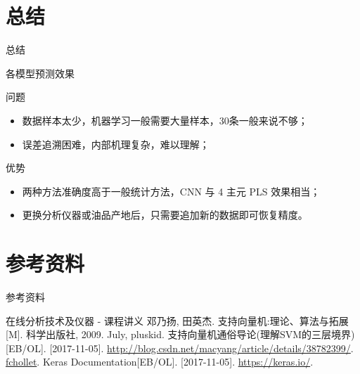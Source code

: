 \documentclass[11pt]{beamer}
\begin{document}
	\section{总结}
	\begin{frame}{总结}
		\begin{block}{各模型预测效果}
		\end{block}
		\begin{block}{问题}
			\begin{itemize}
				\item 数据样本太少，机器学习一般需要大量样本，30条一般来说不够；
				\item 误差追溯困难，内部机理复杂，难以理解；
			\end{itemize}
		\end{block}
		\begin{block}{优势}
			\begin{itemize}
				\item 两种方法准确度高于一般统计方法，CNN 与 4 主元 PLS 效果相当；
				\item 更换分析仪器或油品产地后，只需要追加新的数据即可恢复精度。
			\end{itemize}
		\end{block}
	\end{frame}
	\section{参考资料}
	\begin{frame}{参考资料}
			\begin{thebibliography}{9}
			\bibitem{} 在线分析技术及仪器 - 课程讲义
			\bibitem{} 邓乃扬, 田英杰. 支持向量机:理论、算法与拓展[M]. 科学出版社, 2009.
			\bibitem{} July, pluskid. 支持向量机通俗导论(理解SVM的三层境界)[EB/OL]. [2017-11-05]. \url{http://blog.csdn.net/macyang/article/details/38782399/}.
			\bibitem{} \href{https://github.com/fchollet}{fchollet}. Keras Documentation[EB/OL]. [2017-11-05]. \url{https://keras.io/}.
		\end{thebibliography}
	\end{frame}
\end{document}
